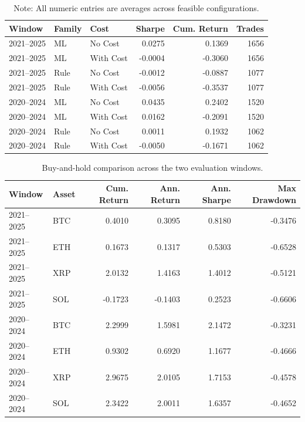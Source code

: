 \documentclass[12pt]{article}
\begin{document}
\begin{table}[H]
\centering
\caption{Model-family comparison across the 2021--2025 and 2020--2024 windows.}
\label{tab:appendix_c_model_family}
\begingroup
\small
\singlespacing
\begin{tabular}{lllrrr}
\toprule
Window & Family & Cost & Sharpe & Cum. Return & Trades \\
\midrule
2021--2025 & ML & No Cost & 0.0275 & 0.1369 & 1656 \\
2021--2025 & ML & With Cost & -0.0004 & -0.3060 & 1656 \\
2021--2025 & Rule & No Cost & -0.0012 & -0.0887 & 1077 \\
2021--2025 & Rule & With Cost & -0.0056 & -0.3537 & 1077 \\
2020--2024 & ML & No Cost & 0.0435 & 0.2402 & 1520 \\
2020--2024 & ML & With Cost & 0.0162 & -0.2091 & 1520 \\
2020--2024 & Rule & No Cost & 0.0011 & 0.1932 & 1062 \\
2020--2024 & Rule & With Cost & -0.0050 & -0.1671 & 1062 \\
\bottomrule
\end{tabular}
\endgroup
\caption*{\footnotesize Note: All numeric entries are averages across feasible configurations.}
\end{table}

\begin{table}[H]
\centering
\caption{Buy-and-hold comparison across the two evaluation windows.}
\label{tab:appendix_c_buyhold}
\begingroup
\small
\singlespacing
\begin{tabular}{llrrrr}
\toprule
Window & Asset & Cum. Return & Ann. Return & Ann. Sharpe & Max Drawdown \\
\midrule
2021--2025 & BTC & 0.4010 & 0.3095 & 0.8180 & -0.3476 \\
2021--2025 & ETH & 0.1673 & 0.1317 & 0.5303 & -0.6528 \\
2021--2025 & XRP & 2.0132 & 1.4163 & 1.4012 & -0.5121 \\
2021--2025 & SOL & -0.1723 & -0.1403 & 0.2523 & -0.6606 \\
2020--2024 & BTC & 2.2999 & 1.5981 & 2.1472 & -0.3231 \\
2020--2024 & ETH & 0.9302 & 0.6920 & 1.1677 & -0.4666 \\
2020--2024 & XRP & 2.9675 & 2.0105 & 1.7153 & -0.4578 \\
2020--2024 & SOL & 2.3422 & 2.0011 & 1.6357 & -0.4652 \\
\bottomrule
\end{tabular}
\endgroup
\end{table}
\end{document}
